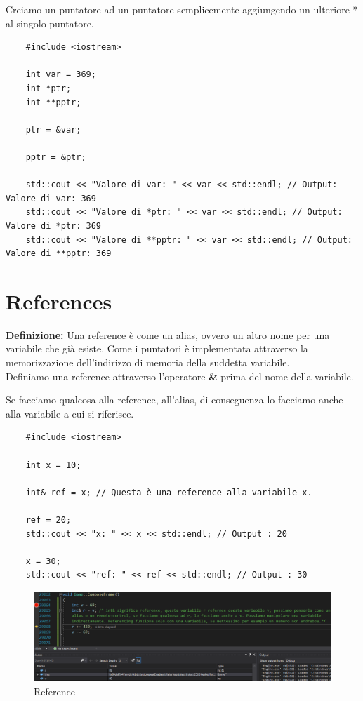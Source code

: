 \textsf{\small Creiamo un puntatore ad un puntatore semplicemente aggiungendo un ulteriore * al singolo puntatore.}

\begin{lstlisting}
	#include <iostream>
	
	int var = 369;
	int *ptr;
	int **pptr;
	
	ptr = &var;
	
	pptr = &ptr;
	
	std::cout << "Valore di var: " << var << std::endl; // Output: Valore di var: 369
	std::cout << "Valore di *ptr: " << var << std::endl; // Output: Valore di *ptr: 369
	std::cout << "Valore di **pptr: " << var << std::endl; // Output: Valore di **pptr: 369
\end{lstlisting}



\section{References}

\textsf{\small \textbf{Definizione: } Una reference è come un alias, ovvero un altro nome per una variabile che già esiste. Come i puntatori è implementata attraverso la memorizzazione dell'indirizzo di memoria della suddetta variabile.} \\

\textsf{\small Definiamo una reference attraverso l'operatore \textbf{\&} prima del nome della variabile.}

\textsf{\small Se facciamo qualcosa alla reference, all'alias, di conseguenza lo facciamo anche alla variabile a cui si riferisce.} \\

\begin{lstlisting}
	#include <iostream>
	
	int x = 10;
	
	int& ref = x; // Questa è una reference alla variabile x.
	
	ref = 20;
	std::cout << "x: " << x << std::endl; // Output : 20
	
	x = 30;
	std::cout << "ref: " << ref << std::endl; // Output : 30
\end{lstlisting}

\begin{figure}[ht]
	\centering
	\includegraphics[width=1\textwidth, height=1\textheight, keepaspectratio]{./imgs/References.png}
	\caption{Reference}
	\label{fig:references1}
\end{figure}

